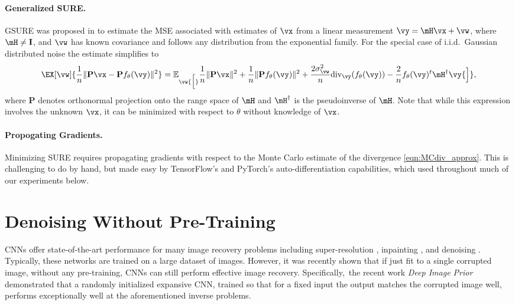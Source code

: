 \documentclass{article}
\newcommand\img{\vx}
\newcommand\obs{\vy}
\newcommand\noise{\vw}
\begin{document}
\paragraph{Generalized SURE.} GSURE was proposed in \cite{GSURE} to estimate the MSE associated with estimates of $\img$ from a linear measurement $\obs = \mH \img + \noise$, where $\mH\neq \mathbf{I}$, and $\noise$ has known covariance and follows any distribution from the exponential family. %
For the special case of i.i.d.~Gaussian distributed noise the estimate simplifies to
\begin{align}\label{eqn:GSURE}
    \EX[\vw]{ \frac{1}{n}\|\mathbf{P}\img-\mathbf{P}f_\theta(\vy)\|^2}
    =\mathbb{E}_\vw {\Big[} \frac{1}{n}\|\mathbf{P}\vx\|^2+\frac{1}{n}\|\mathbf{P}f_\theta(\vy)\|^2+\frac{2\sigma_\vw^2}{n}\text{div}_\vy(f_\theta (\vy))
    -\frac{2}{n}f_\theta (\vy)^t\mH^\dagger \vy {\Big]},
\end{align}
where $\mathbf{P}$ denotes orthonormal projection onto the range space of $\mH$ and $\mH^\dagger$ is the pseudoinverse of $\mH$. Note that while this expression involves the unknown $\img$, it can be minimized with respect to $\theta$ without knowledge of $\img$.

\paragraph{Propogating Gradients.}
Minimizing SURE requires propagating gradients with respect to the Monte Carlo estimate of the divergence \eqref{eqn:MCdiv_approx}. This is challenging to do by hand, but made easy by TensorFlow's and PyTorch's auto-differentiation capabilities, which used throughout much of our experiments below.


\section{Denoising Without Pre-Training\label{sec:OneShotDenoising}}

CNNs offer state-of-the-art performance for many image recovery problems including super-resolution \cite{SRCNN}, inpainting \cite{yang2017high}, and denoising \cite{DnCNN}.
Typically, these networks are trained on a large dataset of images. 
However, it was recently shown that if just fit to a single corrupted image, without any pre-training, CNNs can still perform effective image recovery. 
Specifically,~the recent work {\it Deep Image Prior}\cite{DeepImagePrior} demonstrated that a randomly initialized expansive CNN, trained so that for a fixed input the output matches the corrupted image well, performs exceptionally well at the aforementioned inverse problems.
\end{document}
